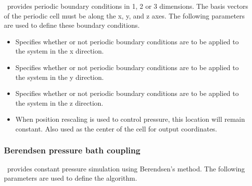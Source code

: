 \NAMD\ provides periodic boundary conditions in 1, 2 or 3 dimensions.
The basis vectors of the periodic cell must be along the x, y, and z axes.  
The following parameters are used to define these boundary conditions.  

\begin{itemize}

\item
{}
{Specifies whether or not periodic boundary conditions 
are to be applied to the system in the x direction.}

\item
{}
{Specifies whether or not periodic boundary conditions 
are to be applied to the system in the y direction.}

\item
{}
{Specifies whether or not periodic boundary conditions 
are to be applied to the system in the z direction.}

\item
{}
{When position rescaling is used to control pressure, this location will remain constant.  Also used as the center of the cell for output coordinates.}

\end{itemize}

\subsubsection{Berendsen pressure bath coupling}

\NAMD\ provides constant pressure simulation using Berendsen's method.  
The following parameters are used to define the algorithm.  

